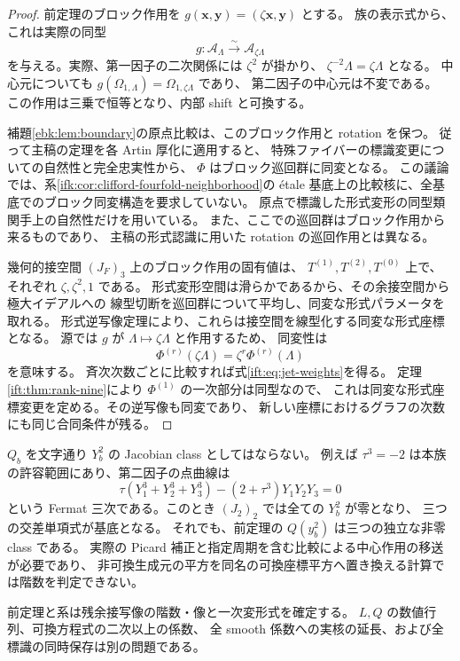 \begin{proof}
前定理のブロック作用を $g(\mathbf x,\mathbf y)=(\zeta\mathbf x,\mathbf y)$ とする。
族の表示式から、これは実際の同型
\[
     g:\mathcal A_\Lambda\xrightarrow{\sim}\mathcal A_{\zeta\Lambda}
\]
を与える。実際、第一因子の二次関係には $\zeta^2$ が掛かり、
$\zeta^{-2}\Lambda=\zeta\Lambda$ となる。
中心元についても
$g(\Omega_{1,\Lambda})=\Omega_{1,\zeta\Lambda}$ であり、
第二因子の中心元は不変である。
この作用は三乗で恒等となり、内部 shift と可換する。

補題\ref{ebk:lem:boundary}の原点比較は、このブロック作用と rotation を保つ。
従って主稿の定理を各 Artin 厚化に適用すると、
特殊ファイバーの標識変更についての自然性と完全忠実性から、
$\Phi$ はブロック巡回群に同変となる。
この議論では、系\ref{ifk:cor:clifford-fourfold-neighborhood}の
\'etale 基底上の比較核に、全基底でのブロック同変構造を要求していない。
原点で標識した形式変形の同型類関手上の自然性だけを用いている。
また、ここでの巡回群はブロック作用から来るものであり、
主稿の形式認識に用いた rotation の巡回作用とは異なる。

幾何的接空間 $(J_F)_3$ 上のブロック作用の固有値は、
$T^{(1)},T^{(2)},T^{(0)}$ 上で、それぞれ $\zeta,\zeta^2,1$ である。
形式変形空間は滑らかであるから、その余接空間から極大イデアルへの
線型切断を巡回群について平均し、同変な形式パラメータを取れる。
形式逆写像定理により、これらは接空間を線型化する同変な形式座標となる。
源では $g$ が $\Lambda\mapsto\zeta\Lambda$ と作用するため、
同変性は
\[
       \Phi^{(r)}(\zeta\Lambda)=\zeta^r\Phi^{(r)}(\Lambda)
\]
を意味する。
斉次次数ごとに比較すれば式\eqref{ift:eq:jet-weights}を得る。
定理\ref{ift:thm:rank-nine}により $\Phi^{(1)}$ の一次部分は同型なので、
これは同変な形式座標変更を定める。その逆写像も同変であり、
新しい座標におけるグラフの次数にも同じ合同条件が残る。
\end{proof}

\begin{remark}[中心平方と可換座標平方の区別]
\label{ift:rem:fermat-warning}
$Q_b$ を文字通り $Y_b^2$ の Jacobian class としてはならない。
例えば $\tau^3=-2$ は本族の許容範囲にあり、第二因子の点曲線は
\[
 \tau(Y_1^3+Y_2^3+Y_3^3)-(2+\tau^3)Y_1Y_2Y_3=0
\]
という Fermat 三次である。このとき $(J_2)_2$ では全ての $Y_b^2$ が零となり、
三つの交差単項式が基底となる。
それでも、前定理の $Q(y_b^2)$ は三つの独立な非零 class である。
実際の Picard 補正と指定周期を含む比較による中心作用の移送が必要であり、
非可換生成元の平方を同名の可換座標平方へ置き換える計算では階数を判定できない。

前定理と系は残余接写像の階数・像と一次変形式を確定する。
$L,Q$ の数値行列、可換方程式の二次以上の係数、
全 smooth 係数への実核の延長、および全標識の同時保存は別の問題である。
\end{remark}
